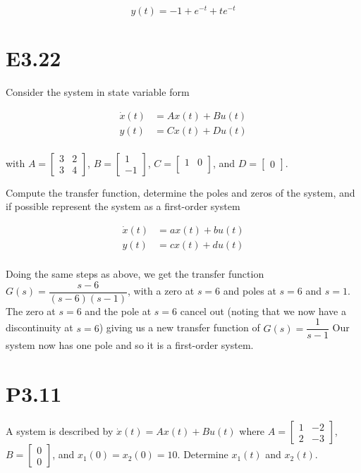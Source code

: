 \documentclass[11pt]{article}
\begin{document}
\[ y(t) = -1 + e^{-t} + te^{-t} \]

\section{E3.22}

Consider the system in state variable form

\begin{align*}
    \dot x(t) &= Ax(t) + Bu(t) \\
    y(t) &= Cx(t) + Du(t) \\
\end{align*}

with $A = \begin{bmatrix} 3 & 2 \\ 3 & 4 \end{bmatrix}$, $B = \begin{bmatrix} 1 \\ -1 \end{bmatrix}$, $C = \begin{bmatrix} 1 & 0 \\ \end{bmatrix}$, and $D = \begin{bmatrix} 0 \end{bmatrix}$.

Compute the transfer function, determine the poles and zeros of the system, and if possible represent the system as a first-order system

\begin{align*}
    \dot x(t) &= ax(t) + bu(t) \\
    y(t) &= cx(t) + du(t) \\
\end{align*}

Doing the same steps as above, we get the transfer function $G(s) = \dfrac{s - 6}{(s - 6)(s - 1)}$, with a zero at $s = 6$ and poles at $s = 6$ and $s = 1$. The zero at $s = 6$ and the pole at $s = 6$ cancel out (noting that we now have a discontinuity at $s = 6$) giving us a new transfer function of $G(s) = \dfrac{1}{s - 1}$ Our system now has one pole and so it is a first-order system.

\section{P3.11}

A system is described by $\dot x(t) = Ax(t) + Bu(t)$ where $A = \begin{bmatrix} 1 & -2 \\ 2 & -3 \end{bmatrix}$, $B = \begin{bmatrix} 0 \\ 0 \end{bmatrix}$, and $x_1(0) = x_2(0) = 10$. Determine $x_1(t)$ and $x_2(t)$.
\end{document}
